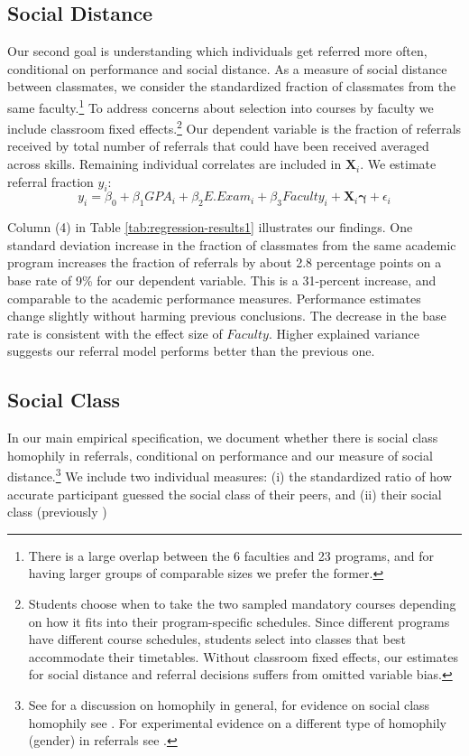 \documentclass[11pt,a4paper,oneside]{article}
\begin{document}
\subsection{Social Distance}
Our second goal is understanding which individuals get referred more often, conditional on performance and social distance. As a measure of social distance between classmates, we consider the standardized fraction of classmates from the same faculty.\footnote{There is a large overlap between the 6 faculties and 23 programs, and for having larger groups of comparable sizes we prefer the former.} To address concerns about selection into courses by faculty we include classroom fixed effects.\footnote{Students choose when to take the two sampled mandatory courses depending on how it fits into their program-specific schedules. Since different programs have different course schedules, students select into classes that best accommodate their timetables. Without classroom fixed effects, our estimates for social distance and referral decisions suffers from omitted variable bias.} Our dependent variable is the fraction of referrals received by total number of referrals that could have been received averaged across skills. Remaining individual correlates are included in $\mathbf{X}_{i}$. We estimate referral fraction $y_{i}$: 
\begin{equation}
    y_{i} = \beta_0 + \beta_1{GPA}_{i} + \beta_2{E.Exam}_{i} + \beta_3{Faculty}_{i} + \mathbf{X}_{i}\boldsymbol{\gamma} + \epsilon_{i}    
\end{equation}

Column (4) in Table \ref{tab:regression-results1} illustrates our findings. One standard deviation increase in the fraction of classmates from the same academic program increases the fraction of referrals by about 2.8 percentage points on a base rate of 9\% for our dependent variable. This is a 31-percent increase, and comparable to the academic performance measures. Performance estimates change slightly without harming previous conclusions. The decrease in the base rate is consistent with the effect size of $Faculty$. Higher explained variance suggests our referral model performs better than the previous one.

\subsection{Social Class}
In our main empirical specification, we document whether there is social class homophily in referrals, conditional on performance and our measure of social distance.\footnote{See \citet{mcpherson2001birds} for a discussion on homophily in general, for evidence on social class homophily see \citet{chetty2022social,chetty2022socialb}. For experimental evidence on a different type of homophily (gender) in referrals see \citet{beaman_job_2018}.} We include two individual measures: (i) the standardized ratio of how accurate participant guessed the social class of their peers, and (ii) their social class (previously )   
\end{document}
